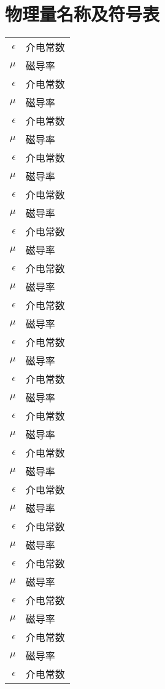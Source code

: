 \chapter{物理量名称及符号表}
\label{chap:symb}

\begin{longtable}{rl}
$\epsilon$     & 介电常数 \\
 $\mu$ 		& 磁导率 \\
 $\epsilon$     & 介电常数 \\
 $\mu$ 		& 磁导率 \\
 $\epsilon$     & 介电常数 \\
 $\mu$ 		& 磁导率 \\
 $\epsilon$ 	& 介电常数 \\
 $\mu$ 		& 磁导率 \\
 $\epsilon$     & 介电常数 \\
 $\mu$ 		& 磁导率 \\
 $\epsilon$     & 介电常数 \\
 $\mu$ 		& 磁导率 \\
 $\epsilon$     & 介电常数 \\
 $\mu$ 		& 磁导率 \\
 $\epsilon$ 	& 介电常数 \\
 $\mu$ 		& 磁导率 \\
 $\epsilon$     & 介电常数 \\
 $\mu$ 		& 磁导率 \\
 $\epsilon$     & 介电常数 \\
 $\mu$ 		& 磁导率 \\
 $\epsilon$     & 介电常数 \\
 $\mu$ 		& 磁导率 \\
 $\epsilon$ 	& 介电常数 \\
 $\mu$ 		& 磁导率 \\
 $\epsilon$     & 介电常数 \\
 $\mu$ 		& 磁导率 \\
 $\epsilon$     & 介电常数 \\
 $\mu$ 		& 磁导率 \\
 $\epsilon$     & 介电常数 \\
 $\mu$ 		& 磁导率 \\
 $\epsilon$ 	& 介电常数 \\
 $\mu$ 		& 磁导率 \\
 $\epsilon$     & 介电常数 \\
 $\mu$ 		& 磁导率 \\
 $\epsilon$     & 介电常数 \\

\end{longtable}
